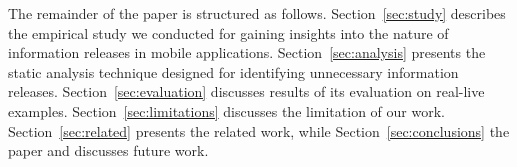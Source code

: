 The remainder of the paper is structured as follows. Section~\ref{sec:study} describes the empirical study we conducted for gaining insights into the nature of information releases in mobile applications. Section~\ref{sec:analysis} presents the static analysis technique designed for identifying unnecessary information releases. 
Section~\ref{sec:evaluation} discusses results of its evaluation on real-live examples. Section~\ref{sec:limitations} discusses the limitation of our work. Section~\ref{sec:related} presents the related work, while Section~\ref{sec:conclusions}  the paper and discusses future work. 


%
%
%


